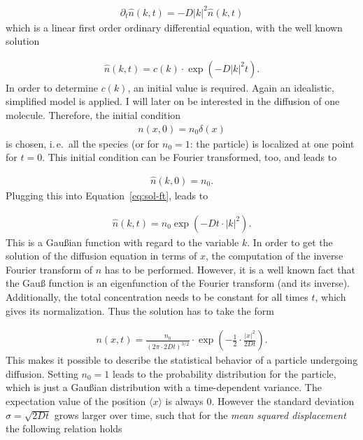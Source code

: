 \begin{align*}
  \partial_t \hat n(k,t) =  - D|k|^2 \hat n(k,t)
\end{align*}
which is a linear first order ordinary differential equation, with the
well known solution

\begin{align}
  \hat n(k,t) = c(k) \cdot \exp(-D|k|^2 t). \label{eq:sol-ft}
\end{align}
In order to determine $c(k)$, an initial value is required. Again an
idealistic, simplified model is applied. I will later on be interested
in the diffusion of one molecule. Therefore, the initial condition
\begin{align*}
  n(x,0) = n_0 \delta(x)
\end{align*}
is chosen, i.\,e.\ all the species (or for $n_0 = 1$: the particle) is
localized at one point for $t = 0$. This initial condition can be
Fourier transformed, too, and leads to

\begin{align*}
  \hat n(k,0) = n_0.
\end{align*}
Plugging this into Equation~\eqref{eq:sol-ft}, leads to

\begin{align*}
  \hat n(k,t) = n_0 \exp(-Dt \cdot |k|^2).
\end{align*}
This is a Gaußian function with regard to the variable $k$. In order
to get the solution of the diffusion equation in terms of $x$, the
computation of the inverse Fourier transform of $\hat n$ has to be
performed. However, it is a well known fact that the Gauß function is
an eigenfunction of the Fourier transform (and its
inverse). Additionally, the total concentration needs to be constant
for all times $t$, which gives its normalization. Thus the solution
has to take the form

\begin{align*}
  n(x,t) = \frac{n_0}{(2\pi \cdot 2Dt)^{3/2}} \cdot \exp \left(
  -\frac{1}{2} \cdot \frac{|x|^2}{2Dt} \right).
\end{align*}
This makes it possible to describe the statistical behavior of a particle
undergoing diffusion. Setting $n_0 = 1$ leads to the probability
distribution for the particle, which is just a Gaußian distribution
with a time-dependent variance. The expectation value of
the position $\langle x \rangle$ is always 0. However the standard
deviation $\sigma = \sqrt{2Dt}$ grows larger over time, such that for
the \emph{mean squared displacement} the following relation holds

